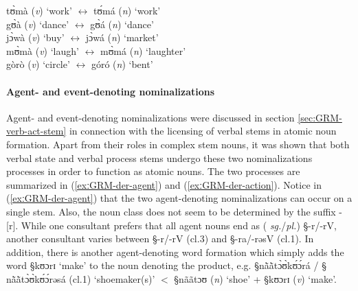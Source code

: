 \begin{exe}
 \ex\label{exːGRM-der-cat-switch}
tʊ̀mà  ({\it v}) `work'  $\leftrightarrow$ tʊ́má ({\it n}) `work'\\
gʊ̀à ({\it v})  `dance' $\leftrightarrow$ gʊ̀á ({\it n}) `dance'\\
jɔ̀wà ({\it v}) `buy'   $\leftrightarrow$ jɔ̀wá  ({\it n})  `market'\\
mʊ̀mà ({\it v}) `laugh'  $\leftrightarrow$ mʊ̀má ({\it n})  `laughter'\\
gòrò ({\it v}) `circle'  $\leftrightarrow$ góró ({\it n})  `bent'
\end{exe}


\paragraph{Agent- and event-denoting nominalizations}
\label{sec:GRM-der-agent}

Agent- and event-denoting nominalizations were discussed in
section \ref{sec:GRM-verb-act-stem} in connection with the licensing of verbal
stems in atomic noun formation. Apart from their roles in complex stem nouns, it
was shown that both verbal state and verbal process stems undergo these two
nominalizations processes in order to function as atomic nouns.
The two
processes are summarized in (\ref{exːGRM-der-agent}) and 
(\ref{exːGRM-der-action}). Notice in (\ref{exːGRM-der-agent}) that the two
agent-denoting nominalizations can occur on a single stem. Also, the
noun class does not seem to be  determined by the suffix
-[r].  While one consultant prefers that all agent nouns end as ({\it
sg.}/{\it pl.}) {\S -r/-rV}, another consultant varies between {\S -r/-rV} 
({\sc cl.3}) and  {\S -ra/-rəsV} ({\sc cl.1}).  In addition, there is another
agent-denoting word formation which simply adds the word {\S kʊɔrɪ} `make' to
the noun denoting the product, e.g. {\S nã̀ã̀tɔ̀ʊ̀kʊ́ɔ́rá} / {\S
nã̀ã̀tɔ̀ʊ̀kʊ́ɔ́rəsá} ({\sc cl.1}) `shoemaker(s)' $<$ {\S nããtɔʊ} ({\it n})
`shoe' + {\S kʊɔrɪ} ({\it v}) `make'.



